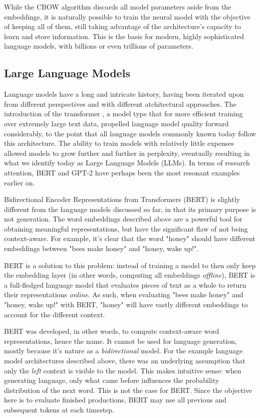 While the CBOW algorithm discards all model parameters aside from the embeddings, it is naturally possible to train the neural model with the objective of keeping all of them, still taking advantage of the architecture's capacity to learn and store information. This is the basis for modern, highly sophisticated language models, with billions or even trillions of parameters.

\subsection{Large Language Models}

Language models have a long and intricate history, having been iterated upon from different perspectives and with different atchitectural approaches. \citep{citationneeded}
The introduction of the transformer \citep{citationneeded}, a model type that for more efficient training over extremely large text data, propelled language model quality forward considerably, to the point that all language models commonly known today follow this architecture.
The ability to train models with relatively little expenses allowed models to grow further and further in perplexity, eventually resulting in what we identify today as Large Language Models (LLMs).
In terms of research attention, BERT \citep{citationneeded} and GPT-2 \citep{citationneeded} have perhaps been the most resonant examples earlier on.

Bidirectional Encoder Representations from Transformers (BERT) is slightly different from the language models discussed so far, in that its primary purpose is not generation.
The word embeddings described above are a powerful tool for obtaining meaningful representations, but have the significant flaw of not being context-aware.
For example, it's clear that the word "honey" should have different embeddings between "bees make honey" and "honey, wake up!".

BERT is a solution to this problem: instead of training a model to then only keep the embedding layer (in other words, computing all embeddings \emph{offline}), BERT is a full-fledged language model that evaluates pieces of text as a whole to return their representations \emph{online}.
As such, when evaluating "bees make honey" and "honey, wake up!" with BERT, "honey" will have vastly different embeddings to account for the different context.

BERT was developed, in other words, to compute context-aware word representations, hence the name. It cannot be used for language generation, mostly because it's nature as a \emph{bidirectional} model.
For the example language model architectures described above, there was an underlying assumption that only the \emph{left} context is visible to the model. This makes intuitive sense: when generating language, only what came before influences the probability distribution of the next word.
This is not the case for BERT. Since the objective here is to evaluate finished productions, BERT may use all previous and subsequent tokens at each timestep.

